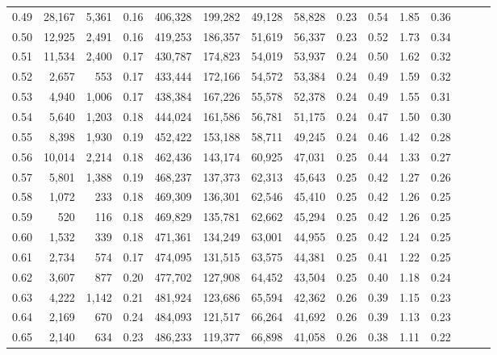 \begin{tabular}{rrrrrrrrrrrrrrr}
0.49 &  28,167 &  5,361 &  0.16 &  406,328 &  199,282 &   49,128 &   58,828 &  0.23 &  0.54 &  1.85 &      0.36 \\
0.50 &  12,925 &  2,491 &  0.16 &  419,253 &  186,357 &   51,619 &   56,337 &  0.23 &  0.52 &  1.73 &      0.34 \\
0.51 &  11,534 &  2,400 &  0.17 &  430,787 &  174,823 &   54,019 &   53,937 &  0.24 &  0.50 &  1.62 &      0.32 \\
0.52 &   2,657 &    553 &  0.17 &  433,444 &  172,166 &   54,572 &   53,384 &  0.24 &  0.49 &  1.59 &      0.32 \\
0.53 &   4,940 &  1,006 &  0.17 &  438,384 &  167,226 &   55,578 &   52,378 &  0.24 &  0.49 &  1.55 &      0.31 \\
0.54 &   5,640 &  1,203 &  0.18 &  444,024 &  161,586 &   56,781 &   51,175 &  0.24 &  0.47 &  1.50 &      0.30 \\
0.55 &   8,398 &  1,930 &  0.19 &  452,422 &  153,188 &   58,711 &   49,245 &  0.24 &  0.46 &  1.42 &      0.28 \\
0.56 &  10,014 &  2,214 &  0.18 &  462,436 &  143,174 &   60,925 &   47,031 &  0.25 &  0.44 &  1.33 &      0.27 \\
0.57 &   5,801 &  1,388 &  0.19 &  468,237 &  137,373 &   62,313 &   45,643 &  0.25 &  0.42 &  1.27 &      0.26 \\
0.58 &   1,072 &    233 &  0.18 &  469,309 &  136,301 &   62,546 &   45,410 &  0.25 &  0.42 &  1.26 &      0.25 \\
0.59 &     520 &    116 &  0.18 &  469,829 &  135,781 &   62,662 &   45,294 &  0.25 &  0.42 &  1.26 &      0.25 \\
0.60 &   1,532 &    339 &  0.18 &  471,361 &  134,249 &   63,001 &   44,955 &  0.25 &  0.42 &  1.24 &      0.25 \\
0.61 &   2,734 &    574 &  0.17 &  474,095 &  131,515 &   63,575 &   44,381 &  0.25 &  0.41 &  1.22 &      0.25 \\
0.62 &   3,607 &    877 &  0.20 &  477,702 &  127,908 &   64,452 &   43,504 &  0.25 &  0.40 &  1.18 &      0.24 \\
0.63 &   4,222 &  1,142 &  0.21 &  481,924 &  123,686 &   65,594 &   42,362 &  0.26 &  0.39 &  1.15 &      0.23 \\
0.64 &   2,169 &    670 &  0.24 &  484,093 &  121,517 &   66,264 &   41,692 &  0.26 &  0.39 &  1.13 &      0.23 \\
0.65 &   2,140 &    634 &  0.23 &  486,233 &  119,377 &   66,898 &   41,058 &  0.26 &  0.38 &  1.11 &      0.22 \\

\end{tabular}
